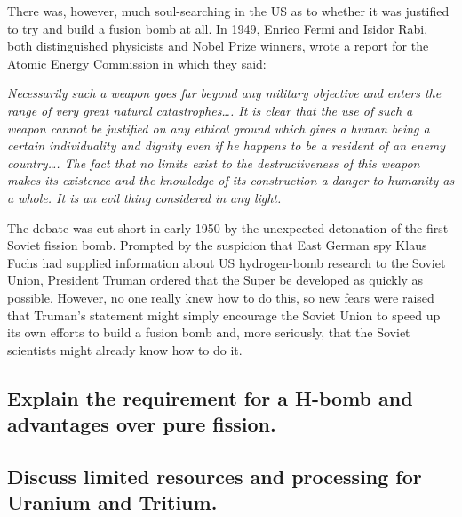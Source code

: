 {There was, however, much soul-searching in the US as to whether it was
justified to try and build a fusion bomb at all. In 1949, Enrico Fermi and Isidor Rabi, both distinguished physicists and Nobel Prize winners, wrote a report for the Atomic Energy Commission in which they said:

\textit{Necessarily such a weapon goes far beyond any military objective and enters the range of very great natural catastrophes…. It is clear that the use of such a weapon cannot
be justified on any ethical ground which gives a human being a certain individuality and dignity even if he happens to be a resident of an enemy country…. The fact that no limits exist to the destructiveness of this weapon makes its existence and the knowledge of its construction a danger to humanity as a whole. It is an evil thing considered in any light.}
\newpage

The debate was cut short in early 1950 by the unexpected detonation of
the first Soviet fission bomb. Prompted by the suspicion that East German spy Klaus Fuchs had supplied information about US hydrogen-bomb research to the Soviet Union, President Truman ordered that the Super be developed as quickly as possible. However, no one really knew how to do this, so new fears were raised that Truman’s statement might simply encourage the Soviet Union to speed up its own efforts to build a fusion bomb and, more seriously, that the Soviet scientists might already know how to do it.
}

\subsection{Explain the requirement for a H-bomb and advantages over pure fission.}

\subsection{Discuss limited resources and processing for Uranium and Tritium.}

